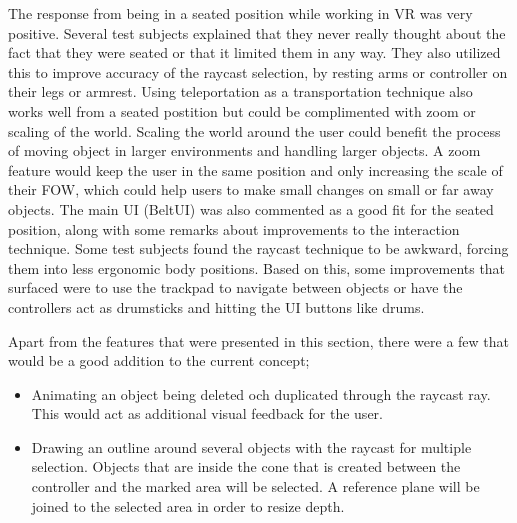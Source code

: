 The response from being in a seated position while working in VR was very positive. Several test subjects explained that they never really thought about the fact that they were seated or that it limited them in any way. They also utilized this to improve accuracy of the raycast selection, by resting arms or controller on their legs or armrest.
Using teleportation as a transportation technique also works well from a seated postition but could be complimented with zoom or scaling of the world. Scaling the world around the user could benefit the process of moving object in larger environments and handling larger objects. A zoom feature would keep the user in the same position and only increasing the scale of their FOW, which could help users to make small changes on small or far away objects. The main UI (BeltUI) was also commented as a good fit for the seated position, along with some remarks about improvements to the interaction technique. Some test subjects found the raycast technique to be awkward, forcing them into less ergonomic body positions. Based on this, some improvements that surfaced were to use the trackpad to navigate between objects or have the controllers act as drumsticks and hitting the UI buttons like drums.

Apart from the features that were presented in this section, there were a few that would be a good addition to the current concept;

\begin{itemize}
  \item Animating an object being deleted och duplicated through the raycast ray. This would act as additional visual feedback for the user.
  \item Drawing an outline around several objects with the raycast for multiple selection. Objects that are inside the cone that is created between the controller and the marked area will be selected. A reference plane will be joined to the selected area in order to resize depth.
\end{itemize}
